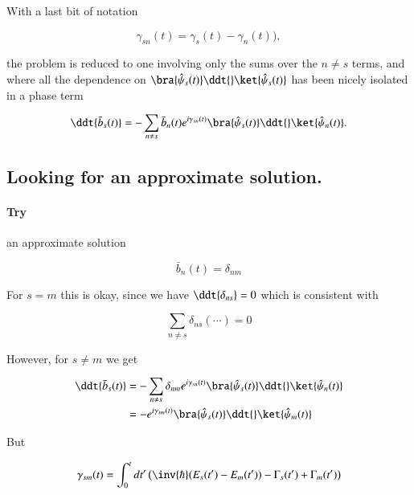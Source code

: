 With a last bit of notation

\begin{equation}\label{eqn:qmTwoL9:130}
\gamma_{sn}(t) = \gamma_s(t) - \gamma_n(t)),
\end{equation}

the problem is reduced to one involving only the sums over the $n \ne s$ terms, and where all the dependence on $\bra{\hat{\psi}_s(t)} \ddt{} \ket{\hat{\psi}_s(t)}$ has been nicely isolated in a phase term

\begin{equation}\label{eqn:qmTwoL9:150}
\ddt{\bar{b}_s(t)} 
=
- 
\sum_{n \ne s} \bar{b}_n(t) 
e^{i \gamma_{sn}(t) }
\bra{\hat{\psi}_s(t)}
\ddt{} \ket{\hat{\psi}_n(t)}.
\end{equation}

\subsection{Looking for an approximate solution.}

\paragraph{Try} an approximate solution

\begin{equation}\label{eqn:qmTwoL9:170}
\bar{b}_n(t) = 
\delta_{nm}
\end{equation}

For $s = m$ this is okay, since we have $\ddt{\delta_{ns}} = 0$ which is consistent with

\begin{equation}\label{eqn:qmTwoL9:190}
\sum_{n \ne s} \delta_{ns} ( \cdots ) = 0
\end{equation}

However, for $s \ne m$ we get

\begin{align*}
\ddt{\bar{b}_s(t)} 
&=
- 
\sum_{n \ne s} 
\delta_{nm}
e^{i \gamma_{sn}(t) }
\bra{\hat{\psi}_s(t)}
\ddt{} \ket{\hat{\psi}_n(t)} \\
&=
- 
e^{i \gamma_{sm}(t) }
\bra{\hat{\psi}_s(t)}
\ddt{} \ket{\hat{\psi}_m(t)} \\
\end{align*}

But 

\begin{equation}\label{eqn:qmTwoL9:210}
\gamma_{sm}(t) = \int_0^t dt' \left( \inv{\hbar}( E_s(t') - E_m(t') ) - \Gamma_s(t') + \Gamma_m(t') \right)
\end{equation}

